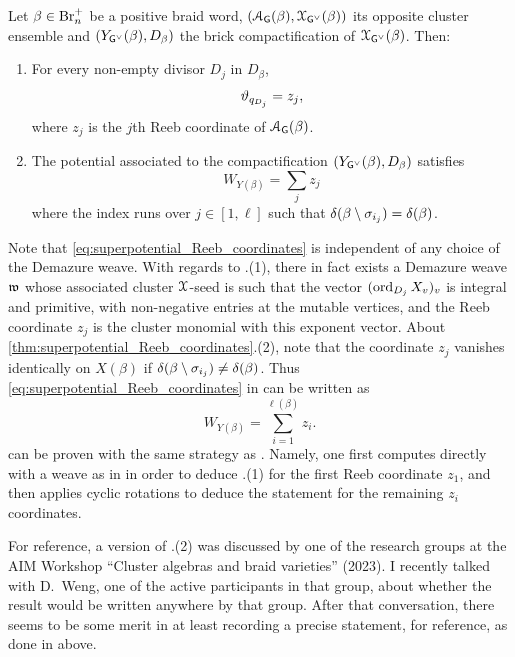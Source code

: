 \begin{theorem}\label{thm:superpotential_Reeb_coordinates} Let $\beta\in\mbox{Br}_n^+$ be a positive braid word, $(\mathcal{A}_{\mathsf{G}}(\beta),\mathcal{X}_{\mathsf{G}^\vee}(\beta))$ its opposite cluster ensemble and $(Y_{\mathsf{G}^\vee}(\beta),D_\beta)$ the brick compactification of $\mathcal{X}_{\mathsf{G}^\vee}(\beta)$. Then:
\begin{enumerate}
    \item For every non-empty divisor $D_j$ in $D_\beta$,
    \begin{equation}\label{eq:individual}
       \vartheta_{q_{D_j}}=z_j,
    \end{equation}
where $z_j$ is the $j$th Reeb coordinate of $\mathcal{A}_{\mathsf{G}}(\beta)$.\\

\item The potential associated to the compactification $(Y_{\mathsf{G}^\vee}(\beta),D_\beta)$ satisfies
\begin{equation}\label{eq:superpotential_Reeb_coordinates}
 \boxed{\displaystyle
 W_{Y(\beta)}=\sum_{j}z_j}
\end{equation}
where the index runs over $j\in[1,\ell]$ such that $\delta(\beta\setminus \sigma_{i_j})=\delta(\beta)$.\sbs
\end{enumerate}
\end{theorem}

Note that \eqref{eq:superpotential_Reeb_coordinates} is independent of any choice of the Demazure weave. With regards to .(1), there in fact exists a Demazure weave $\mathfrak{w}$ whose associated cluster $\mathcal{X}$-seed is such that the vector $(\operatorname{ord}_{D_j}X_v)_v$ is integral and primitive, with non-negative entries at the mutable vertices, and the Reeb coordinate $z_j$ is the cluster monomial with this exponent vector. About \cref{thm:superpotential_Reeb_coordinates}.(2), note that the coordinate $z_j$ vanishes identically on $X(\beta)$ if $\delta(\beta\setminus\sigma_{i_j})\neq \delta(\beta)$. Thus \eqref{eq:superpotential_Reeb_coordinates} in  can be written as
\begin{equation}\label{eq:superpotential_Reeb_coordinates2}
\displaystyle
 W_{Y(\beta)}=\sum_{i=1}^{\ell(\beta)}z_i.
\end{equation}
 can be proven with the same strategy as \cite[Section 5.5]{CGGLSS25}. Namely, one first computes directly with a weave as in \cite[Figure 16 (left)]{CGGLSS25} in order to deduce .(1) for the first Reeb coordinate $z_1$, and then applies cyclic rotations to deduce the statement for the remaining $z_i$ coordinates.

\begin{remark} For reference, a version of .(2) was discussed by one of the research groups at the AIM Workshop ``Cluster algebras and braid varieties'' (2023). I recently talked with D.~Weng, one of the active participants in that group, about whether the result would be written anywhere by that group. After that conversation, there seems to be some merit in at least recording a precise statement, for reference, as done in  above.\sbs
\end{remark}
